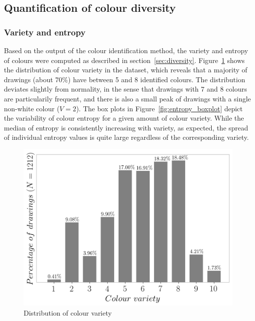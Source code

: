 \documentclass[11pt,a4paper]{article}
\begin{document}
\subsection{Quantification of colour diversity}
\label{sec:results_diversity}

\subsubsection{Variety and entropy}
\label{sec:results_entropy_variety}

Based on the output of the colour identification method, the variety and entropy of colours were computed as described in section~\ref{sec:diversity}. Figure~\ref{fig:variety_histogram} shows the distribution of colour variety in the dataset, which reveals that a majority of drawings (about 70\%) have between 5 and 8 identified colours. The distribution deviates slightly from normality, in the sense that drawings with 7 and 8 colours are particularily frequent, and there is also a small peak of drawings with a single non-white colour ($V=2$). The box plots in Figure~\ref{fig:entropy_boxplot} depict the variability of colour entropy for a given amount of  colour variety. While the median of entropy is consistently increasing with variety, as expected, the spread of individual entropy values is quite large regardless of the corresponding variety.
 
\begin{figure}[h!]
	\centering
	\includegraphics[width=\linewidth]{figures/colors-boxplot-hist.png}
	\caption{Distribution of colour variety}
	\label{fig:variety_histogram}
\end{figure}
\end{document}
